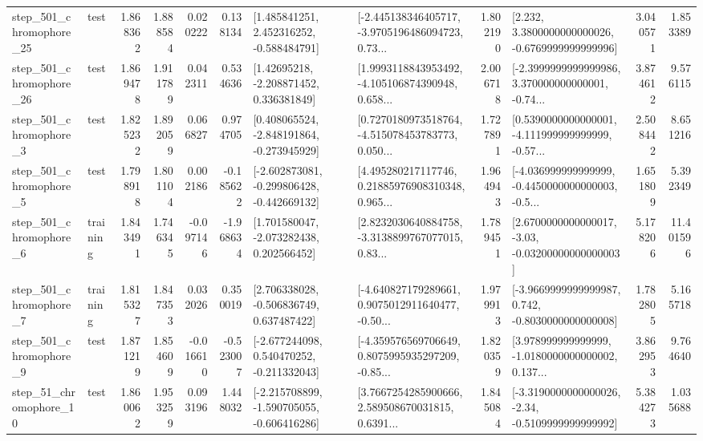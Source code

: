 \begin{tabular}{llrrrrllrlrr}
  step\_501\_chromophore\_25 &      test &      1.868362 &    1.888584 &      0.020222 &  0.138134 &    [1.485841251, 2.452316252, -0.588484791] &  [-2.445138346405717, -3.9705196486094723, 0.73... &       1.802190 &   [2.232, 3.3800000000000026, -0.6769999999999996] &            3.040571 &          1.853389 \\
  step\_501\_chromophore\_26 &      test &      1.869478 &    1.911789 &      0.042311 &  0.534636 &     [1.42695218, -2.208871452, 0.336381849] &  [1.9993118843953492, -4.105106874390948, 0.658... &       2.006718 &  [-2.3999999999999986, 3.370000000000001, -0.74... &            3.874612 &          9.576115 \\
   step\_501\_chromophore\_3 &      test &      1.825232 &    1.892059 &      0.066827 &  0.974705 &   [0.408065524, -2.848191864, -0.273945929] &  [0.7270180973518764, -4.515078453783773, 0.050... &       1.727891 &  [0.5390000000000001, -4.111999999999999, -0.57... &            2.508442 &          8.651216 \\
   step\_501\_chromophore\_5 &      test &      1.798918 &    1.801104 &      0.002186 & -0.185622 &  [-2.602873081, -0.299806428, -0.442669132] &  [4.495280217117746, 0.21885976908310348, 0.965... &       1.964943 &  [-4.036999999999999, -0.4450000000000003, -0.5... &            1.651809 &          5.392349 \\
   step\_501\_chromophore\_6 &  training &      1.843491 &    1.746345 &     -0.097146 & -1.968634 &    [1.701580047, -2.073282438, 0.202566452] &  [2.8232030640884758, -3.3138899767077015, 0.83... &       1.789451 &  [2.6700000000000017, -3.03, -0.03200000000000003] &            5.178206 &         11.401596 \\
   step\_501\_chromophore\_7 &  training &      1.815327 &    1.847353 &      0.032026 &  0.350019 &    [2.706338028, -0.506836749, 0.637487422] &  [-4.640827179289661, 0.9075012911640477, -0.50... &       1.979913 &  [-3.9669999999999987, 0.742, -0.8030000000000008] &            1.782805 &          5.165718 \\
   step\_501\_chromophore\_9 &      test &      1.871219 &    1.854609 &     -0.016610 & -0.523007 &   [-2.677244098, 0.540470252, -0.211332043] &  [-4.359576569706649, 0.8075995935297209, -0.85... &       1.820359 &  [3.978999999999999, -1.0180000000000002, 0.137... &            3.862953 &          9.764640 \\
   step\_51\_chromophore\_10 &      test &      1.860062 &    1.953259 &      0.093196 &  1.448032 &  [-2.215708899, -1.590705055, -0.606416286] &  [3.7667254285900666, 2.589508670031815, 0.6391... &       1.845084 &  [-3.3190000000000026, -2.34, -0.5109999999999992] &            5.384273 &          1.035688 \\

\end{tabular}
